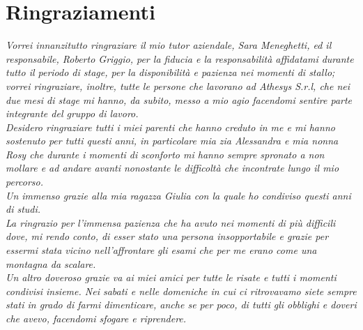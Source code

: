 
\cleardoublepage
{}
{}



\bigskip

\begingroup
\let\clearpage\relax
\let\cleardoublepage\relax
\let\cleardoublepage\relax

\chapter*{Ringraziamenti}

\noindent \textit{Vorrei innanzitutto ringraziare il mio tutor aziendale, Sara Meneghetti, ed il responsabile, Roberto Griggio, per la fiducia e la responsabilità affidatami durante tutto il periodo di stage, per la disponibilità e pazienza nei momenti di stallo; vorrei ringraziare, inoltre, tutte le persone che lavorano ad Athesys S.r.l, che nei due mesi di stage mi hanno, da subito, messo a mio agio facendomi sentire parte integrante del gruppo di lavoro.}\\

\noindent \textit{Desidero ringraziare tutti i miei parenti che hanno creduto in me e mi hanno sostenuto per tutti questi anni, in particolare mia zia Alessandra e mia nonna Rosy che durante i momenti di sconforto mi hanno sempre spronato a non mollare e ad andare avanti nonostante le difficoltà che  incontrate lungo il mio percorso.}\\

\noindent \textit{Un immenso grazie alla mia ragazza Giulia con la quale ho condiviso questi anni di studi.\\
La ringrazio per l'immensa pazienza che ha avuto nei momenti di più difficili dove, mi rendo conto, di esser stato una persona insopportabile e grazie per essermi stata vicino nell'affrontare gli esami che per me erano come una montagna da scalare.}\\

\noindent \textit{Un altro doveroso grazie va ai miei amici per tutte le risate e tutti i momenti condivisi insieme. Nei sabati e nelle domeniche in cui ci ritrovavamo siete sempre stati in grado di farmi dimenticare, anche se per poco, di tutti gli obblighi e doveri che avevo, facendomi sfogare e riprendere.}\\

